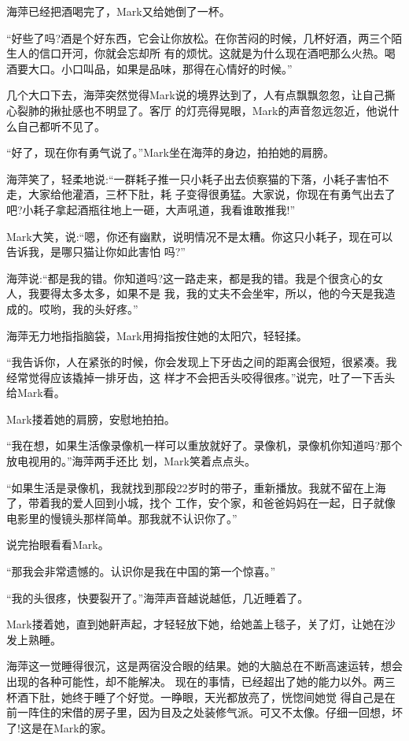 \documentclass[11pt,a4paper,onecolumn]{article}
\begin{document}
海萍已经把酒喝完了，Mark又给她倒了一杯。

``好些了吗?酒是个好东西，它会让你放松。在你苦闷的时候，几杯好酒，两三个陌生人的信口开河，你就会忘却所
有的烦忧。这就是为什么现在酒吧那么火热。喝酒要大口。小口叫品，如果是品味，那得在心情好的时候。''

几个大口下去，海萍突然觉得Mark说的境界达到了，人有点飘飘忽忽，让自己撕心裂肺的揪扯感也不明显了。客厅
的灯亮得晃眼，Mark的声音忽远忽近，他说什么自己都听不见了。

``好了，现在你有勇气说了。''Mark坐在海萍的身边，拍拍她的肩膀。

海萍笑了，轻柔地说:``一群耗子推一只小耗子出去侦察猫的下落，小耗子害怕不走，大家给他灌酒，三杯下肚，耗
子变得很勇猛。大家说，你现在有勇气出去了吧?小耗子拿起酒瓶往地上一砸，大声吼道，我看谁敢推我!''

Mark大笑，说:``嗯，你还有幽默，说明情况不是太糟。你这只小耗子，现在可以告诉我，是哪只猫让你如此害怕
吗?''

海萍说:``都是我的错。你知道吗?这一路走来，都是我的错。我是个很贪心的女人，我要得太多太多，如果不是
我，我的丈夫不会坐牢，所以，他的今天是我造成的。哎哟，我的头好疼。''

海萍无力地指指脑袋，Mark用拇指按住她的太阳穴，轻轻揉。

``我告诉你，人在紧张的时候，你会发现上下牙齿之间的距离会很短，很紧凑。我经常觉得应该撬掉一排牙齿，这
样才不会把舌头咬得很疼。''说完，吐了一下舌头给Mark看。

Mark搂着她的肩膀，安慰地拍拍。

``我在想，如果生活像录像机一样可以重放就好了。录像机，录像机你知道吗?那个放电视用的。''海萍两手还比
划，Mark笑着点点头。

``如果生活是录像机，我就找到那段22岁时的带子，重新播放。我就不留在上海了，带着我的爱人回到小城，找个
工作，安个家，和爸爸妈妈在一起，日子就像电影里的慢镜头那样简单。那我就不认识你了。''

说完抬眼看看Mark。

``那我会非常遗憾的。认识你是我在中国的第一个惊喜。''

``我的头很疼，快要裂开了。''海萍声音越说越低，几近睡着了。

Mark搂着她，直到她鼾声起，才轻轻放下她，给她盖上毯子，关了灯，让她在沙发上熟睡。

海萍这一觉睡得很沉，这是两宿没合眼的结果。她的大脑总在不断高速运转，想会出现的各种可能性，却不能解决。
现在的事情，已经超出了她的能力以外。两三杯酒下肚，她终于睡了个好觉。一睁眼，天光都放亮了，恍惚间她觉
得自己是在前一阵住的宋借的房子里，因为目及之处装修气派。可又不太像。仔细一回想，坏了!这是在Mark的家。
\end{document}
